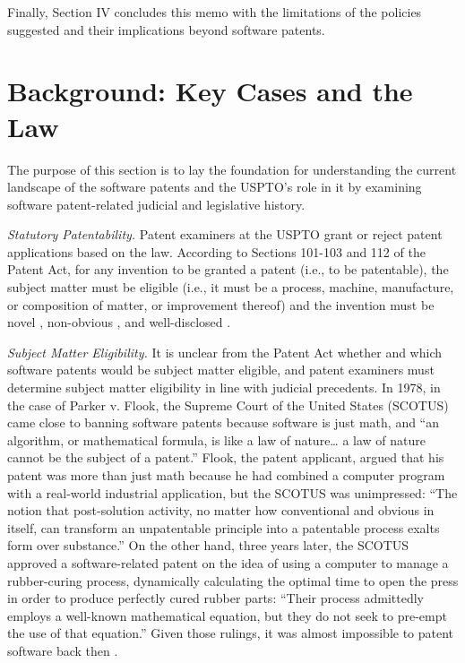 \documentclass[12pt]{texMemo} %
\begin{document}
Finally, Section IV concludes this memo with the limitations of the policies suggested and their implications beyond software patents.

\section{Background: Key Cases and the Law}

The purpose of this section is to lay the foundation for understanding the current landscape of the software patents and the USPTO’s role in it by examining software patent-related judicial and legislative history.

\textit{Statutory Patentability.} Patent examiners at the USPTO grant or reject patent applications based on the law. According to Sections 101-103 and 112 of the Patent Act, for any invention to be granted a patent (i.e., to be patentable), the subject matter must be eligible (i.e., it must be a process, machine, manufacture, or composition of matter, or improvement thereof) \cite{35usc101} and the invention must be novel \cite{35usc102}, non-obvious \cite{35usc103}, and well-disclosed \cite{35usc112}.

\textit{Subject Matter Eligibility.} It is unclear from the Patent Act whether and which software patents would be subject matter eligible, and patent examiners must determine subject matter eligibility in line with judicial precedents. In 1978, in the case of Parker v. Flook, the Supreme Court of the United States (SCOTUS) came close to banning software patents because software is just math, and “an algorithm, or mathematical formula, is like a law of nature… a law of nature cannot be the subject of a patent.” Flook, the patent applicant, argued that his patent was more than just math because he had combined a computer program with a real-world industrial application, but the SCOTUS was unimpressed: “The notion that post-solution activity, no matter how conventional and obvious in itself, can transform an unpatentable principle into a patentable process exalts form over substance.” On the other hand, three years later, the SCOTUS approved a software-related patent on the idea of using a computer to manage a rubber-curing process, dynamically calculating the optimal time to open the press in order to produce perfectly cured rubber parts: “Their process admittedly employs a well-known mathematical equation, but they do not seek to pre-empt the use of that equation.” Given those rulings, it was almost impossible to patent software back then \cite{lee-scotus}.
\end{document}

